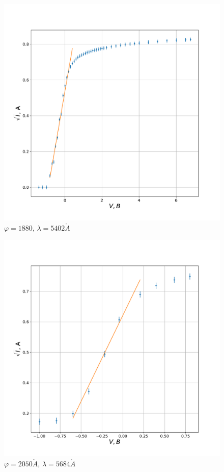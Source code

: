\documentclass[a4paper, 12pt]{article}
\renewcommand{\phi}{\varphi}
\renewcommand{\AA}{\ensuremath{\mathring{A}}}
\begin{document}
\begin{figure}[H]
    \centering
    \includegraphics[scale=0.5]{1880}
    \caption {$\phi = 1880$, $\lambda = 5402 \AA$}
\end{figure}

\begin{figure}[H]
    \centering
    \includegraphics[scale=0.5]{2050}
    \caption {$\phi = 2050 \AA$, $\lambda = 5684 \AA$}
\end{figure}
\end{document}
